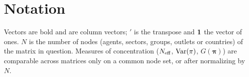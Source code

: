 \chapter*{Notation}

Vectors are bold and are column vectors; $'$ is the transpose and $\mathbf{1}$ the vector of ones. $N$ is the number of nodes (agents, sectors, groups, outlets or countries) of the matrix in question. Measures of concentration ($N_{\text{eff}}$, $\operatorname{Var}(\pi)$, $G(\boldsymbol{\pi})$) are comparable across matrices only on a common node set, or after normalizing by $N$.

